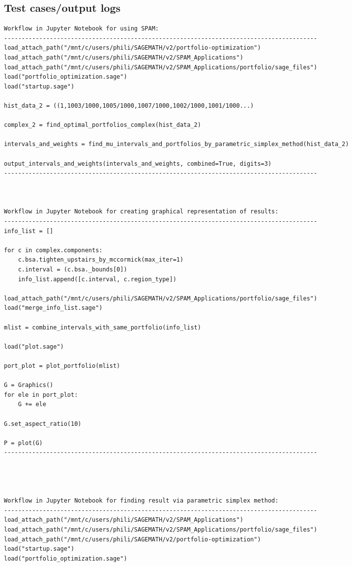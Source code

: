 \documentclass{article}
\begin{document}
\subsection{Test cases/output logs}
\bigskip
\begin{changemargin}{-3cm}{-3cm} 
\begin{verbatim}
Workflow in Jupyter Notebook for using SPAM:
-----------------------------------------------------------------------------------------
load_attach_path("/mnt/c/users/phili/SAGEMATH/v2/portfolio-optimization")
load_attach_path("/mnt/c/users/phili/SAGEMATH/v2/SPAM_Applications")
load_attach_path("/mnt/c/users/phili/SAGEMATH/v2/SPAM_Applications/portfolio/sage_files")
load("portfolio_optimization.sage")
load("startup.sage")

hist_data_2 = ((1,1003/1000,1005/1000,1007/1000,1002/1000,1001/1000...)

complex_2 = find_optimal_portfolios_complex(hist_data_2)

intervals_and_weights = find_mu_intervals_and_portfolios_by_parametric_simplex_method(hist_data_2)

output_intervals_and_weights(intervals_and_weights, combined=True, digits=3)
-----------------------------------------------------------------------------------------


    
Workflow in Jupyter Notebook for creating graphical representation of results:
-----------------------------------------------------------------------------------------
info_list = []

for c in complex.components:
    c.bsa.tighten_upstairs_by_mccormick(max_iter=1)
    c.interval = (c.bsa._bounds[0])
    info_list.append([c.interval, c.region_type])
    
load_attach_path("/mnt/c/users/phili/SAGEMATH/v2/SPAM_Applications/portfolio/sage_files")
load("merge_info_list.sage")

mlist = combine_intervals_with_same_portfolio(info_list)

load("plot.sage")

port_plot = plot_portfolio(mlist)

G = Graphics()
for ele in port_plot:
    G += ele
    
G.set_aspect_ratio(10)

P = plot(G)
-----------------------------------------------------------------------------------------

    


Workflow in Jupyter Notebook for finding result via parametric simplex method:
-----------------------------------------------------------------------------------------
load_attach_path("/mnt/c/users/phili/SAGEMATH/v2/SPAM_Applications")
load_attach_path("/mnt/c/users/phili/SAGEMATH/v2/SPAM_Applications/portfolio/sage_files")
load_attach_path("/mnt/c/users/phili/SAGEMATH/v2/portfolio-optimization")
load("startup.sage")
load("portfolio_optimization.sage")


\end{verbatim}
\end{changemargin}
\end{document}
